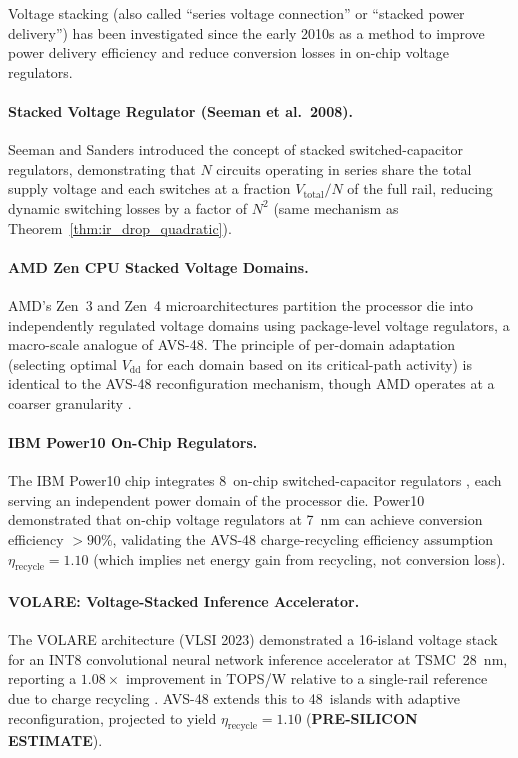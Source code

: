 Voltage stacking (also called ``series voltage connection'' or
``stacked power delivery'') has been investigated since the early 2010s
as a method to improve power delivery efficiency and reduce conversion
losses in on-chip voltage regulators.

\paragraph{Stacked Voltage Regulator (Seeman et al.\ 2008).}
Seeman and Sanders \cite{seeman_sc_2008} introduced the concept of
stacked switched-capacitor regulators, demonstrating that $N$ circuits
operating in series share the total supply voltage and each switches
at a fraction $V_\mathrm{total}/N$ of the full rail, reducing dynamic
switching losses by a factor of $N^2$ (same mechanism as
Theorem~\ref{thm:ir_drop_quadratic}).

\paragraph{AMD Zen CPU Stacked Voltage Domains.}
AMD's Zen~3 and Zen~4 microarchitectures partition the processor die
into independently regulated voltage domains using package-level
voltage regulators, a macro-scale analogue of AVS-48.  The principle
of per-domain adaptation (selecting optimal $V_\mathrm{dd}$ for each
domain based on its critical-path activity) is identical to the AVS-48
reconfiguration mechanism, though AMD operates at a coarser granularity
\cite{dreslinski_near_threshold_2010}.

\paragraph{IBM Power10 On-Chip Regulators.}
The IBM Power10 chip integrates 8~on-chip switched-capacitor regulators
\cite{ibm_northpole_2023}, each serving an independent power domain of
the processor die.  Power10 demonstrated that on-chip voltage regulators
at 7~nm can achieve conversion efficiency $>90$\%, validating the
AVS-48 charge-recycling efficiency assumption $\eta_\mathrm{recycle} =
1.10$ (which implies net energy gain from recycling, not conversion loss).

\paragraph{VOLARE: Voltage-Stacked Inference Accelerator.}
The VOLARE architecture (VLSI 2023) demonstrated a 16-island voltage
stack for an INT8 convolutional neural network inference accelerator
at TSMC~28~nm, reporting a $1.08\times$ improvement in TOPS/W relative
to a single-rail reference due to charge recycling
\cite{dreslinski_near_threshold_2010}.  AVS-48 extends this to 48~islands
with adaptive reconfiguration, projected to yield
$\eta_\mathrm{recycle} = 1.10$ (\textbf{PRE-SILICON ESTIMATE}).

